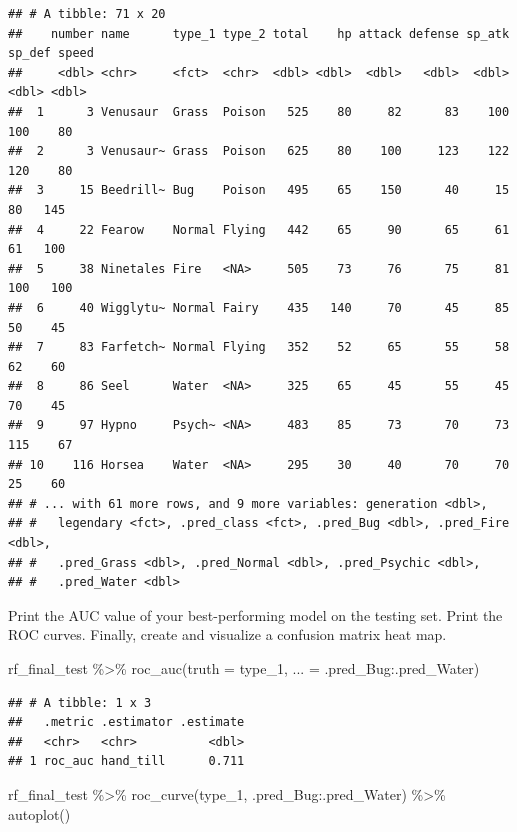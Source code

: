 \documentclass[
]{article}
\newenvironment{Shaded}{\begin{snugshade}}{\end{snugshade}}
\newcommand{\AttributeTok}[1]{\textcolor[rgb]{0.77,0.63,0.00}{#1}}
\newcommand{\FunctionTok}[1]{\textcolor[rgb]{0.00,0.00,0.00}{#1}}
\newcommand{\NormalTok}[1]{#1}
\newcommand{\SpecialCharTok}[1]{\textcolor[rgb]{0.00,0.00,0.00}{#1}}
\begin{document}
\begin{verbatim}
## # A tibble: 71 x 20
##    number name      type_1 type_2 total    hp attack defense sp_atk sp_def speed
##     <dbl> <chr>     <fct>  <chr>  <dbl> <dbl>  <dbl>   <dbl>  <dbl>  <dbl> <dbl>
##  1      3 Venusaur  Grass  Poison   525    80     82      83    100    100    80
##  2      3 Venusaur~ Grass  Poison   625    80    100     123    122    120    80
##  3     15 Beedrill~ Bug    Poison   495    65    150      40     15     80   145
##  4     22 Fearow    Normal Flying   442    65     90      65     61     61   100
##  5     38 Ninetales Fire   <NA>     505    73     76      75     81    100   100
##  6     40 Wigglytu~ Normal Fairy    435   140     70      45     85     50    45
##  7     83 Farfetch~ Normal Flying   352    52     65      55     58     62    60
##  8     86 Seel      Water  <NA>     325    65     45      55     45     70    45
##  9     97 Hypno     Psych~ <NA>     483    85     73      70     73    115    67
## 10    116 Horsea    Water  <NA>     295    30     40      70     70     25    60
## # ... with 61 more rows, and 9 more variables: generation <dbl>,
## #   legendary <fct>, .pred_class <fct>, .pred_Bug <dbl>, .pred_Fire <dbl>,
## #   .pred_Grass <dbl>, .pred_Normal <dbl>, .pred_Psychic <dbl>,
## #   .pred_Water <dbl>
\end{verbatim}

Print the AUC value of your best-performing model on the testing set.
Print the ROC curves. Finally, create and visualize a confusion matrix
heat map.

\begin{Shaded}
\begin{Highlighting}[]
\NormalTok{rf\_final\_test }\SpecialCharTok{\%\textgreater{}\%} \FunctionTok{roc\_auc}\NormalTok{(}\AttributeTok{truth =}\NormalTok{ type\_1, }\AttributeTok{... =}\NormalTok{ .pred\_Bug}\SpecialCharTok{:}\NormalTok{.pred\_Water)}
\end{Highlighting}
\end{Shaded}

\begin{verbatim}
## # A tibble: 1 x 3
##   .metric .estimator .estimate
##   <chr>   <chr>          <dbl>
## 1 roc_auc hand_till      0.711
\end{verbatim}

\begin{Shaded}
\begin{Highlighting}[]
\NormalTok{rf\_final\_test }\SpecialCharTok{\%\textgreater{}\%} \FunctionTok{roc\_curve}\NormalTok{(type\_1, .pred\_Bug}\SpecialCharTok{:}\NormalTok{.pred\_Water) }\SpecialCharTok{\%\textgreater{}\%}
  \FunctionTok{autoplot}\NormalTok{()}
\end{Highlighting}
\end{Shaded}
\end{document}
